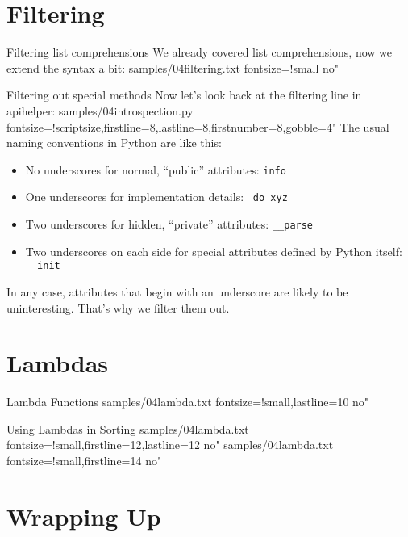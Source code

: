 \documentclass{pyslides}
\begin{document}
\section{Filtering}

\begin{frame}[fragile]{Filtering list comprehensions}
We already covered list comprehensions, now we extend the syntax a bit:
 samples/04filtering.txt fontsize=!small no"
\end{frame}

\begin{frame}[fragile]{Filtering out special methods}
Now let's look back at the filtering line in apihelper:
 samples/04introspection.py fontsize=!scriptsize,firstline=8,lastline=8,firstnumber=8,gobble=4"
\bigskip
The usual naming conventions in Python are like this:
\begin{itemize}
\item No underscores for normal, “public” attributes: \verb+info+
\item One underscores for implementation details: \verb+_do_xyz+
\item Two underscores for hidden, “private” attributes: \verb+__parse+
\item Two underscores on each side for special attributes defined by Python itself: \verb+__init__+
\end{itemize}
In any case, attributes that begin with an underscore are likely to be uninteresting. That's why we filter them out.
\end{frame}

\section{Lambdas}

\begin{frame}[fragile]{Lambda Functions}
 samples/04lambda.txt fontsize=!small,lastline=10 no"
\end{frame}

\begin{frame}[fragile]{Using Lambdas in Sorting}
 samples/04lambda.txt fontsize=!small,firstline=12,lastline=12 no"
 samples/04lambda.txt fontsize=!small,firstline=14 no"
\end{frame}

\section{Wrapping Up}
\end{document}
